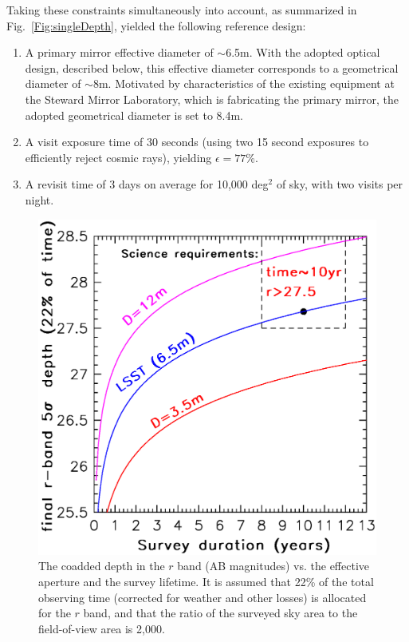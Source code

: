 \documentclass{emulateapj}
\begin{document}
Taking these constraints simultaneously into account, as summarized in 
Fig.~\ref{Fig:singleDepth}, 
yielded the following reference design:
\begin{enumerate}
\item A primary mirror effective diameter of $\sim$6.5m. With the adopted optical 
design, described below, this effective diameter corresponds to a geometrical diameter 
of $\sim$8m. Motivated by characteristics of the existing equipment at the
Steward Mirror Laboratory, which is fabricating the primary mirror, the adopted
geometrical diameter is set to 8.4m. 
\item A visit exposure time of 30 seconds (using two 15 second exposures
to efficiently reject cosmic rays), yielding $\epsilon=77$\%.
\item A revisit time of 3 days on average for 10,000 deg$^2$ of sky, 
  with two visits per night.
\end{enumerate}

\begin{figure}[t]
\vskip -0.5in
\includegraphics[width=1.1\hsize,clip]{coaddedDepth.ps}
\vskip -1.1in
\caption{The coadded depth in the $r$ band (AB magnitudes) vs. the effective aperture and 
the survey lifetime. It is assumed that 22\% of the total observing time (corrected for
weather and other losses) is allocated for the $r$ band, and that the ratio of 
the surveyed sky area to the field-of-view area is 2,000.} 
\label{Fig:coaddDepth}
\end{figure}
\end{document}

